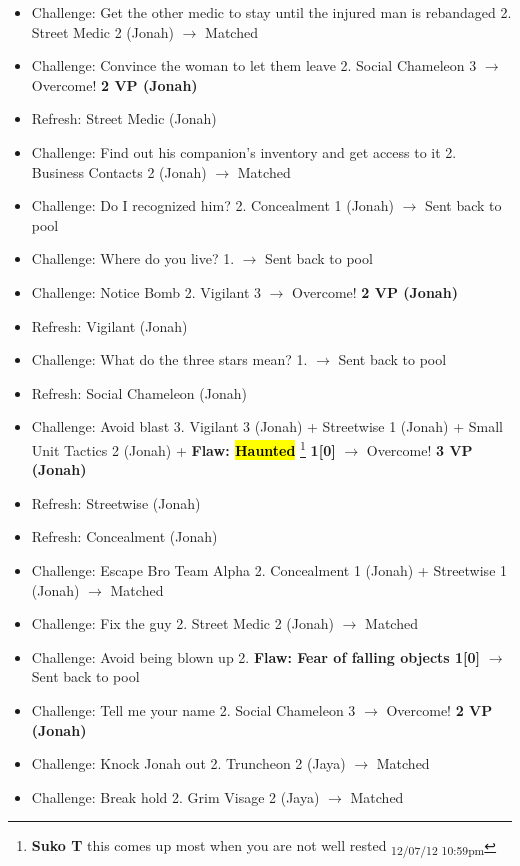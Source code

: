{
\parskip=0pt
\begin{itemize}
\item Challenge: Get the other medic to stay until the injured man is rebandaged 2.  Street Medic 2 (Jonah) $\rightarrow$ Matched
\item Challenge: Convince the woman to let them leave 2.  Social Chameleon 3 $\rightarrow$ Overcome! \textbf{2 VP (Jonah)}
\item Refresh: Street Medic (Jonah)
\item Challenge: Find out his companion's inventory and get access to it 2. Business Contacts 2 (Jonah) $\rightarrow$ Matched
\item Challenge: Do I recognized him? 2.  Concealment 1 (Jonah) $\rightarrow$ Sent back to pool
\item Challenge: Where do you live? 1. $\rightarrow$ Sent back to pool
\item Challenge: Notice Bomb 2. Vigilant 3 $\rightarrow$ Overcome! \textbf{2 VP (Jonah)}
\item Refresh: Vigilant (Jonah)
\item Challenge: What do the three stars mean? 1. $\rightarrow$ Sent back to pool
\item Refresh: Social Chameleon (Jonah)
\item Challenge: Avoid blast 3. Vigilant 3 (Jonah) + Streetwise 1 (Jonah) + Small Unit Tactics 2 (Jonah) + \textbf{ {\color[RGB]{255,0,0}Flaw: } }\textbf{ {\color[RGB]{255,0,0}\hl{Haunted}} }\footnote{\textbf{Suko T }this comes up most when you are not well rested \textsubscript{12/07/12 10:59pm}}\textbf{ {\color[RGB]{255,0,0} 1{[}0{]}} } $\rightarrow$ Overcome! \textbf{3 VP (Jonah)}
\item Refresh: Streetwise (Jonah)
\item Refresh: Concealment (Jonah)
\item Challenge: Escape Bro Team Alpha 2. Concealment 1 (Jonah) + Streetwise 1 (Jonah) $\rightarrow$ Matched
\item Challenge: Fix the guy 2.  Street Medic 2 (Jonah) $\rightarrow$ Matched
\item Challenge: Avoid being blown up 2. \textbf{ {\color[RGB]{255,0,0}Flaw: Fear of falling objects 1{[}0{]}} } $\rightarrow$ Sent back to pool
\item Challenge: Tell me your name 2. Social Chameleon 3 $\rightarrow$ Overcome! \textbf{2 VP (Jonah)}
\item Challenge: Knock Jonah out 2. Truncheon 2 (Jaya) $\rightarrow$ Matched
\item Challenge: Break hold 2. Grim Visage 2 (Jaya) $\rightarrow$ Matched

\end{itemize}}
